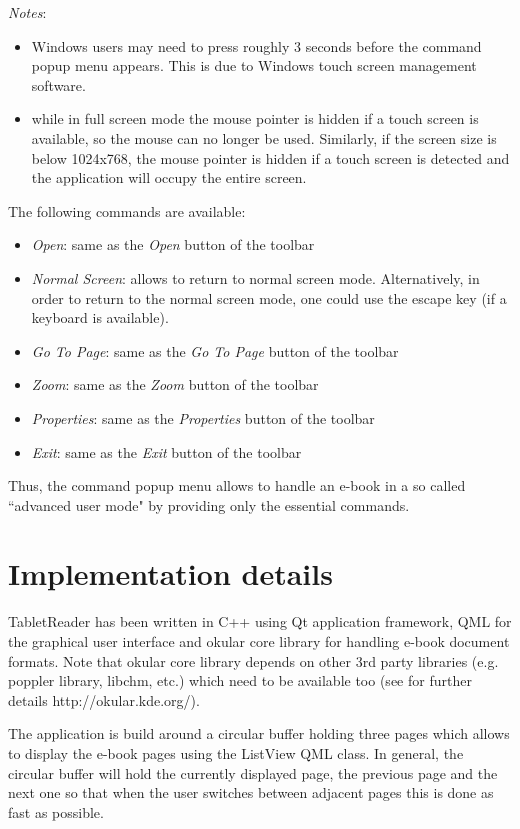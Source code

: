 \documentclass[journal,12pt]{IEEEtran}
\begin{document}
\textit{Notes}: 
\begin{itemize}
 \item Windows users may need to press roughly 3 seconds before the command popup menu appears. This is due to Windows touch screen management software.
 \item while in full screen mode the mouse pointer is hidden if a touch screen is available, so the mouse can no longer be used. Similarly, if the screen size is below 1024x768, the mouse pointer is hidden if a touch screen is detected and the application will occupy the entire screen.
\end{itemize}

The following commands are available:
\begin{itemize}
 \item \textit{Open}: same as the \textit{Open} button of the toolbar
\item \textit{Normal Screen}: allows to return to normal screen mode. Alternatively, in order to return to the normal screen mode, one could use the escape key (if a keyboard is available).
 \item \textit{Go To Page}: same as the \textit{Go To Page} button of the toolbar
 \item \textit{Zoom}: same as the \textit{Zoom} button of the toolbar
 \item \textit{Properties}: same as the \textit{Properties} button of the toolbar
 \item \textit{Exit}: same as the \textit{Exit} button of the toolbar
\end{itemize}
Thus, the command popup menu allows to handle an e-book in a so called ``advanced user mode" by providing only the essential commands.

\section{Implementation details}
TabletReader has been written in C++ using Qt application framework, QML for the graphical user interface and okular core library for handling e-book document formats. Note that okular core library depends on other 3rd party libraries (e.g. poppler library, libchm, etc.) which need to be available too (see for further details http://okular.kde.org/).

The application is build around a circular buffer holding three pages which allows to display the e-book pages using the \textrm{ListView} QML class. In general, the circular buffer will hold the currently displayed page, the previous page and the next one so that when the user switches between adjacent pages this is done as fast as possible. 
\end{document}
